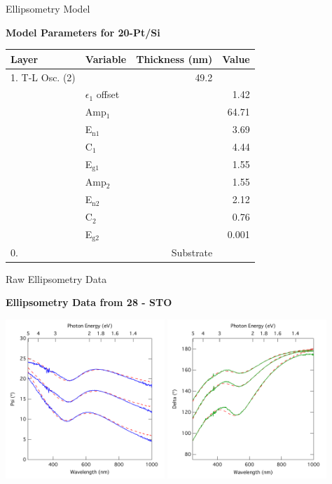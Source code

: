 \documentclass[professionalfont]{beamer}
\begin{document}
\begin{frame}{Ellipsometry Model}
	\begin{center}
	{\bfseries\large Model Parameters for 20-Pt/Si}\\[1em]
	\begin{tabular}{l l r r}
	\toprule
	Layer&Variable&Thickness (nm)&Value\\
	\midrule
	1. T-L Osc. (2)&&49.2&\\
	&$\epsilon_{1}$ offset&&1.42\\
	&Amp$_{1}$&&64.71\\
	&E$_{\mathrm{n 1}}$&&3.69\\
	&C$_{1}$&&4.44\\
	&E$_{\mathrm{g1}}$&&1.55\\
	&Amp$_{2}$&&1.55\\
	&E$_{\mathrm{n 2}}$&&2.12\\
	&C$_{2}$&&0.76\\
	&E$_{\mathrm{g2}}$&&0.001\\
	0. \ce{STO}&&Substrate&\\
	\bottomrule
	\end{tabular}
	\end{center}
\end{frame}

\begin{frame}{Raw Ellipsometry Data}
		\begin{center}
		\textbf{\large Ellipsometry Data from 28 - STO}\vspace{0.25cm}
		\centerline{\includegraphics[width=0.45\textwidth]{./graphics/data/ellipsometry/run-28-sto/psi}%
				 \hspace{1cm}%
				 \includegraphics[width=0.45\textwidth]{./graphics/data/ellipsometry/run-28-sto/delta}}
		\end{center}
\end{frame}
\end{document}
